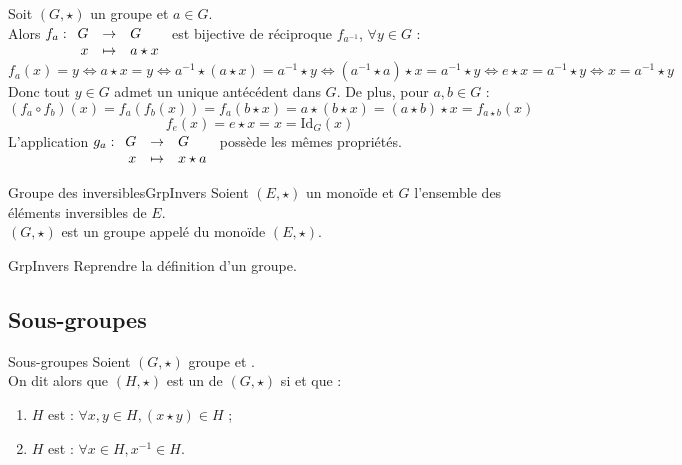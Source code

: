 \documentclass[12pt,a4paper]{report}
\begin{document}
    \begin{remarque} Soit $(G, \star)$ un groupe et $a \in G$.\\
    Alors $f_a : \begin{array}[t]{rcl} G & \rightarrow & G \\ x & \mapsto & a \star x \end{array}$ est bijective de réciproque $f_{a^{-1}}$, $\forall y \in G$ :
    $$ f_a(x) = y \Leftrightarrow a \star x = y \Leftrightarrow a^{-1} \star (a \star x) = a^{-1} \star y \Leftrightarrow \left(a^{-1} \star a\right) \star x = a^{-1} \star y \Leftrightarrow e \star x = a^{-1} \star y \Leftrightarrow x = a^{-1} \star y $$
    Donc tout $y \in G$ admet un unique antécédent dans $G$. De plus, pour $a, b \in G$ :
    $$ \left(f_a \circ f_b\right) (x) = f_a \left( f_b (x) \right) = f_a (b \star x) = a \star (b \star x) = (a \star b) \star x = f_{a \star b} (x) $$
    $$ f_e (x) = e \star x = x = \text{Id}_G (x) $$
    L'application $g_a : \begin{array}[t]{rcl} G & \rightarrow & G \\ x & \mapsto & x \star a \end{array}$ possède les mêmes propriétés.
    \end{remarque}
    
    \begin{proposition}{Groupe des inversibles}{GrpInvers}
    Soient $(E, \star)$ un monoïde et $G$ l'ensemble des éléments inversibles de $E$.\\
    $(G, \star)$ est un groupe appelé  du monoïde $(E, \star)$.
    \end{proposition}
    
    \begin{principedemo}{GrpInvers}
    Reprendre la définition d'un groupe.
    \end{principedemo}
    
    \pagebreak
    
    \subsection{Sous-groupes}
    
    \begin{definition}{Sous-groupes}{}
    Soient $(G, \star)$ groupe et .\\
    On dit alors que $(H, \star)$ est un  de $(G, \star)$ si  et que :
    \begin{enumerate}[label=\bfseries\arabic*)]
        \item $H$ est  : $\forall x, y \in H, (x \star y) \in H$ ;
        \item $H$ est  : $\forall x \in H, x^{-1} \in H$.
    \end{enumerate}
    \end{definition}
    
\end{document}
